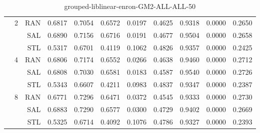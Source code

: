 \begin{center}
\begin{table}[htbp]
\begin{tabular}{ | r | r | r | r | r | r | r | r | r | r | r |}
 & \multirow{3}{*}{2} & RAN & 0.6817 & 0.7054 & 0.6572 & 0.0197 & 0.4625 & 0.9318 & 0.0000 & 0.2650\\ \cline{3-11}
 &   & SAL & 0.6890 & 0.7156 & 0.6716 & 0.0191 & 0.4677 & 0.9504 & 0.0000 & 0.2658\\ \cline{3-11}
 &   & STL & 0.5317 & 0.6701 & 0.4119 & 0.1062 & 0.4826 & 0.9357 & 0.0000 & 0.2425\\ \cline{2-11}
 & \multirow{3}{*}{4} & RAN & 0.6806 & 0.7174 & 0.6552 & 0.0266 & 0.4638 & 0.9460 & 0.0000 & 0.2712\\ \cline{3-11}
 &   & SAL & 0.6808 & 0.7030 & 0.6581 & 0.0183 & 0.4587 & 0.9540 & 0.0000 & 0.2726\\ \cline{3-11}
 &   & STL & 0.5343 & 0.6607 & 0.4211 & 0.0983 & 0.4837 & 0.9347 & 0.0000 & 0.2387\\ \cline{2-11}
 & \multirow{3}{*}{8} & RAN & 0.6771 & 0.7296 & 0.6471 & 0.0372 & 0.4545 & 0.9333 & 0.0000 & 0.2730\\ \cline{3-11}
 &   & SAL & 0.6883 & 0.7290 & 0.6577 & 0.0300 & 0.4729 & 0.9402 & 0.0000 & 0.2669\\ \cline{3-11}
 &   & STL & 0.5325 & 0.6714 & 0.4092 & 0.1076 & 0.4786 & 0.9327 & 0.0000 & 0.2393\\ \cline{2-11}
\hline
\end{tabular}
\caption{grouped-liblinear-enron-GM2-ALL-ALL-50}
\end{table}
\end{center}


